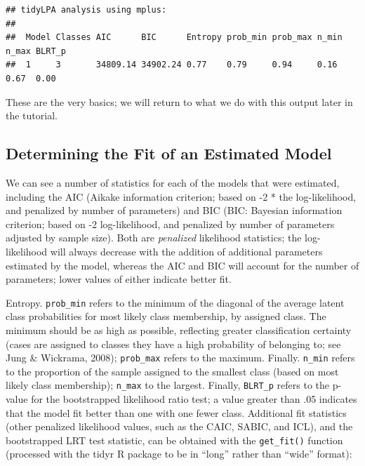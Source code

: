 \documentclass[english,man]{apa6}
\begin{document}
\begin{verbatim}
## tidyLPA analysis using mplus: 
## 
##  Model Classes AIC      BIC      Entropy prob_min prob_max n_min n_max BLRT_p
##  1     3       34809.14 34902.24 0.77    0.79     0.94     0.16  0.67  0.00
\end{verbatim}

These are the very basics; we will return to what we do with this output later
in the tutorial.

\hypertarget{determining-the-fit-of-an-estimated-model}{%
\subsection{Determining the Fit of an Estimated Model}\label{determining-the-fit-of-an-estimated-model}}

We can see a number of statistics for each of the models that were estimated,
including the AIC (Aikake information criterion; based on -2 * the
log-likelihood, and penalized by number of parameters) and BIC (BIC: Bayesian
information criterion; based on -2 log-likelihood, and penalized by number of
parameters adjusted by sample size). Both are \emph{penalized} likelihood statistics;
the log-likelihood will always decrease with the addition of additional
parameters estimated by the model, whereas the AIC and BIC will account for the
number of parameters; lower values of either indicate better fit.

Entropy. \texttt{prob\_min} refers to the minimum of the diagonal of the average latent
class probabilities for most likely class membership, by assigned class. The
minimum should be as high as possible, reflecting greater classification
certainty (cases are assigned to classes they have a high probability of
belonging to; see Jung \& Wickrama, 2008); \texttt{prob\_max} refers to the maximum.
Finally. \texttt{n\_min} refers to the proportion of the sample assigned to the smallest
class (based on most likely class membership); \texttt{n\_max} to the largest. Finally,
\texttt{BLRT\_p} refers to the p-value for the bootstrapped likelihood ratio test; a
value greater than .05 indicates that the model fit better than one with one
fewer class. Additional fit statistics (other penalized likelihood values, such
as the CAIC, SABIC, and ICL), and the bootstrapped LRT test statistic, can be
obtained with the \texttt{get\_fit()} function (processed with the tidyr R package to be in \enquote{long} rather than \enquote{wide} format):
\end{document}
